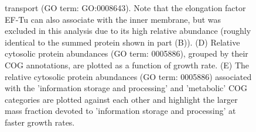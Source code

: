 \begin{figure}
\begin{fullwidth}
{{            transport (GO term: GO:0008643). Note that the elongation factor
            EF-Tu can also associate with the inner membrane, but was excluded
            in this analysis due to its high relative abundance (roughly
            identical to the summed protein shown in part (B)).
        (D) Relative cytosolic protein abundances (GO term: 0005886), grouped by their COG annotations, are
            plotted as a function of growth rate.
        (E) The relative cytosolic protein
            abundances (GO term: 0005886) associated with the 'information
            storage and processing' and 'metabolic' COG categories are plotted
            against each other and highlight the larger mass fraction devoted to
            'information storage and processing' at faster growth rates.
            }\label{fig:energy_scaling}
            }
                \end{fullwidth}
\end{figure}
